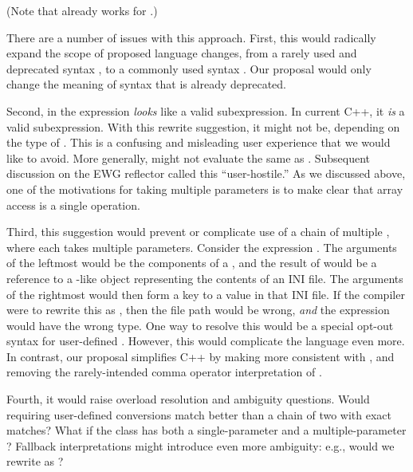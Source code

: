 \documentclass{wg21}
\begin{document}
(Note that  already works for .)  

There are a number of issues with this approach.  First, this would radically expand the scope of proposed language changes, from a rarely used and deprecated syntax , to a commonly used syntax .  Our proposal would only change the meaning of syntax that is already deprecated.

Second,  in the expression  \emph{looks} like a valid subexpression.  In current C++, it \emph{is} a valid subexpression.  With this rewrite suggestion, it might not be, depending on the type of .  This is a confusing and misleading user experience that we would like to avoid.  More generally,  might not evaluate the same as .  Subsequent discussion on the EWG reflector called this ``user-hostile.''  As we discussed above, one of the motivations for  taking multiple parameters is to make clear that array access is a single operation.

Third, this suggestion would prevent or complicate use of a chain of multiple , where each  takes multiple parameters.  Consider the expression .  The arguments of the leftmost  would be the components of a , and the result of  would be a reference to a -like object representing the contents of an INI file.  The arguments of the rightmost  would then form a key to a value in that INI file.  If the compiler were to rewrite this as , then the file path would be wrong, \emph{and} the expression would have the wrong type.  One way to resolve this would be a special opt-out syntax for user-defined .  However, this would complicate the language even more.  In contrast, our proposal simplifies C++ by making  more consistent with , and removing the rarely-intended comma operator interpretation of .

Fourth, it would raise overload resolution and ambiguity questions.  Would  requiring user-defined conversions match better than a chain of two  with exact matches?  What if the class has both a single-parameter and a multiple-parameter ?  Fallback interpretations might introduce even more ambiguity: e.g., would we rewrite  as ?  
\end{document}
